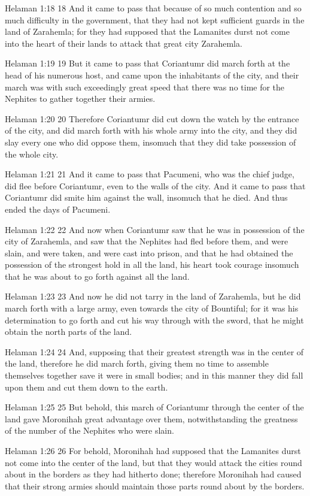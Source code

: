 Helaman 1:18
 18 And it came to pass that because of so much contention and so
much difficulty in the government, that they had not kept
sufficient guards in the land of Zarahemla; for they had supposed
that the Lamanites durst not come into the heart of their lands
to attack that great city Zarahemla.

Helaman 1:19
 19 But it came to pass that Coriantumr did march forth at the
head of his numerous host, and came upon the inhabitants of the
city, and their march was with such exceedingly great speed that
there was no time for the Nephites to gather together their
armies.

Helaman 1:20
 20 Therefore Coriantumr did cut down the watch by the entrance
of the city, and did march forth with his whole army into the
city, and they did slay every one who did oppose them, insomuch
that they did take possession of the whole city.

Helaman 1:21
 21 And it came to pass that Pacumeni, who was the chief judge,
did flee before Coriantumr, even to the walls of the city. And
it came to pass that Coriantumr did smite him against the wall,
insomuch that he died. And thus ended the days of Pacumeni.

Helaman 1:22
 22 And now when Coriantumr saw that he was in possession of the
city of Zarahemla, and saw that the Nephites had fled before
them, and were slain, and were taken, and were cast into prison,
and that he had obtained the possession of the strongest hold in
all the land, his heart took courage insomuch that he was about
to go forth against all the land.

Helaman 1:23
 23 And now he did not tarry in the land of Zarahemla, but he did
march forth with a large army, even towards the city of
Bountiful; for it was his determination to go forth and cut his
way through with the sword, that he might obtain the north parts
of the land.

Helaman 1:24
 24 And, supposing that their greatest strength was in the center
of the land, therefore he did march forth, giving them no time to
assemble themselves together save it were in small bodies; and in
this manner they did fall upon them and cut them down to the
earth.

Helaman 1:25
 25 But behold, this march of Coriantumr through the center of
the land gave Moronihah great advantage over them,
notwithstanding the greatness of the number of the Nephites who
were slain.

Helaman 1:26
 26 For behold, Moronihah had supposed that the Lamanites durst
not come into the center of the land, but that they would attack
the cities round about in the borders as they had hitherto done;
therefore Moronihah had caused that their strong armies should
maintain those parts round about by the borders.

